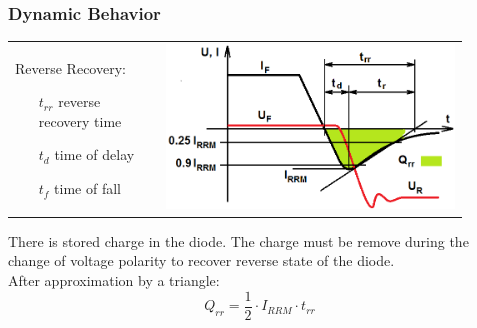 \documentclass{beamer}
\begin{document}
	\begin{frame}
    \frametitle{Dynamic Behavior}
		\begin{tabular}{m{0.3\linewidth} m{0.6\linewidth}}
		Reverse Recovery:
		
		\begin{itemize}
			\item [$t_{rr}$] reverse recovery time
			\item [$t_{d}$] time of delay
			\item [$t_{f}$] time of fall
		\end{itemize}
		 &
		\includegraphics[scale=0.3]{obr07_zavZot.png} 
		\end{tabular}
		There is stored charge in the diode. The charge must be remove during the change of voltage polarity to recover reverse state of the diode.\\
		After approximation by a triangle: $$Q_{rr}=\frac{1}{2}\cdot I_{RRM}\cdot t_{rr}$$
	\end{frame}
\end{document}
